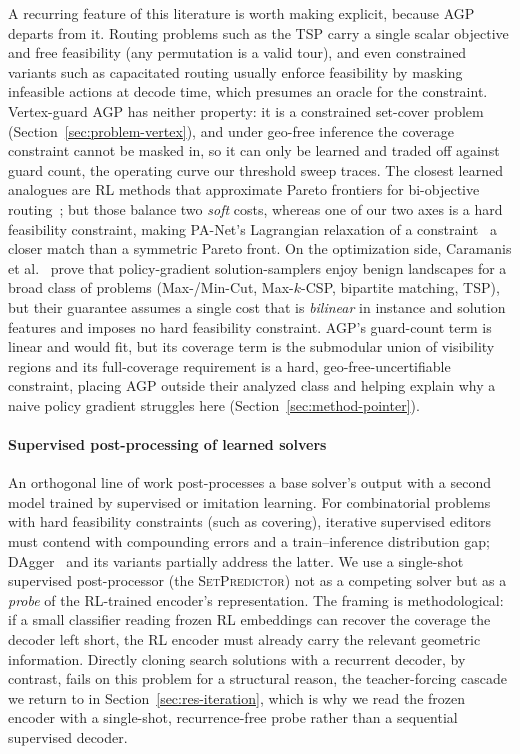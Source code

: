 \documentclass[11pt]{article}
\newcommand{\SetPredictor}{\textup{\textsc{SetPredictor}}}
\begin{document}
A recurring feature of this literature is worth making explicit, because AGP departs from it. Routing problems such as the TSP carry a single scalar objective and free feasibility (any permutation is a valid tour), and even constrained variants such as capacitated routing usually enforce feasibility by masking infeasible actions at decode time, which presumes an oracle for the constraint. Vertex-guard AGP has neither property: it is a constrained set-cover problem (Section~\ref{sec:problem-vertex}), and under geo-free inference the coverage constraint cannot be masked in, so it can only be learned and traded off against guard count, the operating curve our threshold sweep traces. The closest learned analogues are RL methods that approximate Pareto frontiers for bi-objective routing~\cite{Mehta2022PANet,Li2019DRLMOA}; but those balance two \emph{soft} costs, whereas one of our two axes is a hard feasibility constraint, making PA-Net's Lagrangian relaxation of a constraint~\cite{Mehta2022PANet} a closer match than a symmetric Pareto front. On the optimization side, Caramanis et al.~\cite{Caramanis2023Landscape} prove that policy-gradient solution-samplers enjoy benign landscapes for a broad class of problems (Max-/Min-Cut, Max-$k$-CSP, bipartite matching, TSP), but their guarantee assumes a single cost that is \emph{bilinear} in instance and solution features and imposes no hard feasibility constraint. AGP's guard-count term is linear and would fit, but its coverage term is the submodular union of visibility regions and its full-coverage requirement is a hard, geo-free-uncertifiable constraint, placing AGP outside their analyzed class and helping explain why a naive policy gradient struggles here (Section~\ref{sec:method-pointer}).

\paragraph{Supervised post-processing of learned solvers} An orthogonal line of work post-processes a base solver's output with a second model trained by supervised or imitation learning. For combinatorial problems with hard feasibility constraints (such as covering), iterative supervised editors must contend with compounding errors and a train--inference distribution gap; DAgger~\cite{RossGordonBagnell2011DAgger} and its variants partially address the latter. We use a single-shot supervised post-processor (the \SetPredictor{}) not as a competing solver but as a \emph{probe} of the RL-trained encoder's representation. The framing is methodological: if a small classifier reading frozen RL embeddings can recover the coverage the decoder left short, the RL encoder must already carry the relevant geometric information. Directly cloning search solutions with a recurrent decoder, by contrast, fails on this problem for a structural reason, the teacher-forcing cascade we return to in Section~\ref{sec:res-iteration}, which is why we read the frozen encoder with a single-shot, recurrence-free probe rather than a sequential supervised decoder.
\end{document}
